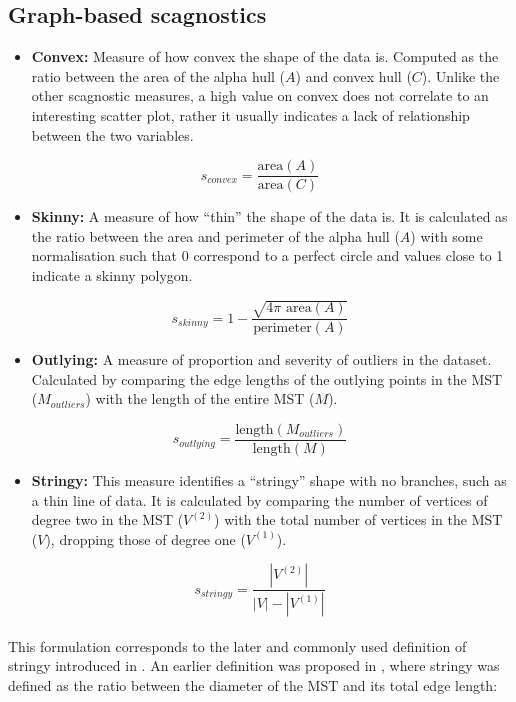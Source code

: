 \subsection{Graph-based scagnostics}\label{graph-based-scagnostics}

\begin{itemize}
\tightlist
\item
  \textbf{Convex:} Measure of how convex the shape of the data is. Computed as the ratio between the area of the alpha hull (\(A\)) and convex hull (\(C\)). Unlike the other scagnostic measures, a high value on convex does not correlate to an interesting scatter plot, rather it usually indicates a lack of relationship between the two variables.
\end{itemize}

\[s_{convex}=\frac{\mbox{area}(A)}{\mbox{area}(C)}\]

\begin{itemize}
\tightlist
\item
  \textbf{Skinny:} A measure of how ``thin'' the shape of the data is. It is calculated as the ratio between the area and perimeter of the alpha hull (\(A\)) with some normalisation such that 0 correspond to a perfect circle and values close to 1 indicate a skinny polygon.
\end{itemize}

\[s_{skinny}= 1-\frac{\sqrt{4\pi \mbox{ area}(A)}}{\mbox{perimeter}(A)}\]

\begin{itemize}
\tightlist
\item
  \textbf{Outlying:} A measure of proportion and severity of outliers in the dataset. Calculated by comparing the edge lengths of the outlying points in the MST (\(M_{outliers}\)) with the length of the entire MST (\(M\)).
\end{itemize}

\[s_{outlying}=\frac{\mbox{length}(M_{outliers})}{\mbox{length}(M)}\]

\begin{itemize}
\tightlist
\item
  \textbf{Stringy:} This measure identifies a ``stringy'' shape with no branches, such as a thin line of data. It is calculated by comparing the number of vertices of degree two in the MST (\(V^{(2)}\)) with the total number of vertices in the MST (\(V\)), dropping those of degree one (\(V^{(1)}\)).
\end{itemize}

\[s_{stringy} = \frac{|V^{(2)}|}{|V|-|V^{(1)}|}\]\\
This formulation corresponds to the later and commonly used definition of stringy introduced in \citet{wilkinson2006high}. An earlier definition was proposed in \citet{scag}, where stringy was defined as the ratio between the diameter of the MST and its total edge length:

